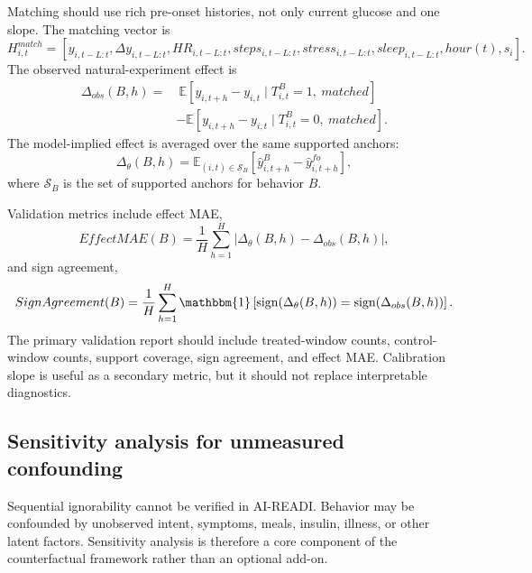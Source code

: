 Matching should use rich pre-onset histories, not only current glucose and one slope. The matching vector is
\begin{equation}
    H^{match}_{i,t}=
    \left[y_{i,t-L:t},\Delta y_{i,t-L:t},HR_{i,t-L:t},steps_{i,t-L:t},stress_{i,t-L:t},sleep_{i,t-L:t},hour(t),s_i\right].
\end{equation}
The observed natural-experiment effect is
\begin{align}
    \Delta_{obs}(B,h)
    =
    &\ \mathbb{E}\left[y_{i,t+h}-y_{i,t}\mid T^B_{i,t}=1,\ matched\right]
    \\
    &-\mathbb{E}\left[y_{i,t+h}-y_{i,t}\mid T^B_{i,t}=0,\ matched\right].
    \label{eq:observed_effect}
\end{align}
The model-implied effect is averaged over the same supported anchors:
\begin{equation}
    \Delta_\theta(B,h)
    = \mathbb{E}_{(i,t)\in\mathcal{S}_B}
    \left[\hat{y}^{B}_{i,t+h}-\hat{y}^{fo}_{i,t+h}\right],
    \label{eq:average_model_effect}
\end{equation}
where $\mathcal{S}_B$ is the set of supported anchors for behavior $B$.

Validation metrics include effect MAE,
\begin{equation}
    EffectMAE(B)
    = \frac{1}{H}\sum_{h=1}^{H}
    \left|\Delta_\theta(B,h)-\Delta_{obs}(B,h)\right|,
\end{equation}
and sign agreement,
\begin{equation}
    SignAgreement(B)
    = \frac{1}{H}\sum_{h=1}^{H}
    \mathbbm{1}\left[\mathrm{sign}(\Delta_\theta(B,h))=\mathrm{sign}(\Delta_{obs}(B,h))\right].
\end{equation}
The primary validation report should include treated-window counts, control-window counts, support coverage, sign agreement, and effect MAE. Calibration slope is useful as a secondary metric, but it should not replace interpretable diagnostics.

\subsection{Sensitivity analysis for unmeasured confounding}
\label{subsec:sensitivity_analysis}

Sequential ignorability cannot be verified in AI-READI. Behavior may be confounded by unobserved intent, symptoms, meals, insulin, illness, or other latent factors. Sensitivity analysis is therefore a core component of the counterfactual framework rather than an optional add-on.

